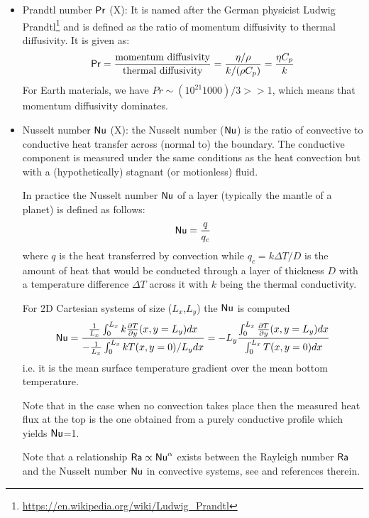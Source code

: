 \begin{itemize}
\item {\color{violet} Prandtl number} ${\mathsf{Pr}}$ (X):  
It is named after the German physicist 
Ludwig Prandtl\footnote{\url{https://en.wikipedia.org/wiki/Ludwig_Prandtl}} 
and is defined as the ratio of momentum diffusivity to thermal diffusivity. 
It is given as: 
\[
{\mathsf{Pr}} = \frac{\text{momentum diffusivity}}{\text{thermal diffusivity}} = \frac{\eta/\rho}{k/(\rho C_p)}= \frac{\eta C_p}{k}
\]
For Earth materials, we have $Pr \sim (10^{21} 1000)/3 >> 1$, 
which means that momentum diffusivity dominates.

\item {\color{violet} Nusselt number} ${\mathsf{Nu}}$ (X):   
the Nusselt number (${\mathsf{Nu}}$) 
is the ratio of convective to conductive heat transfer across (normal to) the boundary. 
The conductive component is measured under the same conditions as the heat convection 
but with a (hypothetically) stagnant (or motionless) fluid.

In practice the Nusselt number ${\mathsf{Nu}}$ of a layer (typically the mantle of a planet) is defined as follows:
\begin{equation}
{\mathsf{Nu}} = \frac{q}{q_c}
\end{equation} 
where $q$ is the heat transferred by convection while $q_c=k \Delta T /D$ 
is the amount of heat that would be conducted through a layer of
thickness $D$ with a temperature difference $\Delta T$ across it with 
$k$ being the thermal conductivity.

For 2D Cartesian systems of size ($L_x$,$L_y$) the ${\mathsf{Nu}}$ is computed \cite{blbc89}
\[
{\mathsf{Nu}} = 
\frac{\frac{1}{L_x}\int_{0}^{L_x} k \frac{\partial T}{\partial y}(x,y=L_y) dx }
{-\frac{1}{L_x}\int_0^{L_x} k T(x,y=0) /L_y dx}
=-L_y \frac{\int_{0}^{L_x} \frac{\partial T}{\partial y}(x,y=L_y) dx }{\int_0^{L_x} T(x,y=0) dx}
\]
i.e. it is the mean surface temperature gradient
over the mean bottom temperature.


Note that in the case when no convection takes place then the measured heat flux at the top is 
the one obtained from a purely conductive profile which yields ${\mathsf{Nu}}$=1.

Note that a relationship  ${\mathsf{Ra}} \propto {\mathsf{Nu}}^\alpha $ exists between the Rayleigh 
number ${\mathsf{Ra}}$ and the Nusselt number ${\mathsf{Nu}}$ in convective systems, see \cite{wodd09} and references therein. 


\end{itemize}
